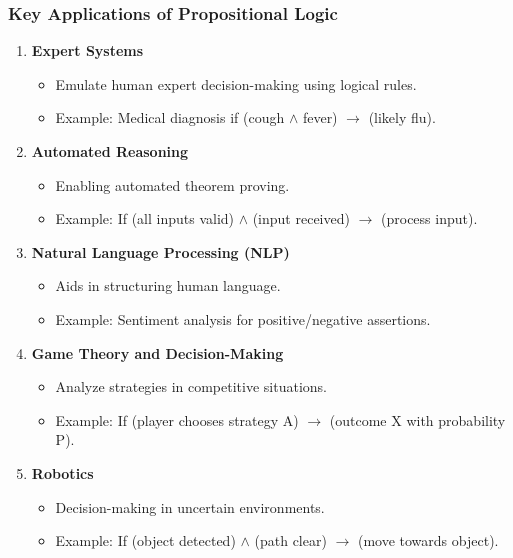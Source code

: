 \documentclass[aspectratio=169]{beamer}
\begin{document}
\begin{frame}[fragile]
    \frametitle{Key Applications of Propositional Logic}
    \begin{enumerate}
        \item \textbf{Expert Systems}
            \begin{itemize}
                \item Emulate human expert decision-making using logical rules.
                \item Example: Medical diagnosis if (cough $\land$ fever) $\rightarrow$ (likely flu).
            \end{itemize}
        \item \textbf{Automated Reasoning}
            \begin{itemize}
                \item Enabling automated theorem proving.
                \item Example: If (all inputs valid) $\land$ (input received) $\rightarrow$ (process input).
            \end{itemize}
        \item \textbf{Natural Language Processing (NLP)}
            \begin{itemize}
                \item Aids in structuring human language.
                \item Example: Sentiment analysis for positive/negative assertions.
            \end{itemize}
        \item \textbf{Game Theory and Decision-Making}
            \begin{itemize}
                \item Analyze strategies in competitive situations.
                \item Example: If (player chooses strategy A) $\rightarrow$ (outcome X with probability P).
            \end{itemize}
        \item \textbf{Robotics}
            \begin{itemize}
                \item Decision-making in uncertain environments.
                \item Example: If (object detected) $\land$ (path clear) $\rightarrow$ (move towards object).
            \end{itemize}
    \end{enumerate}
\end{frame}
\end{document}
